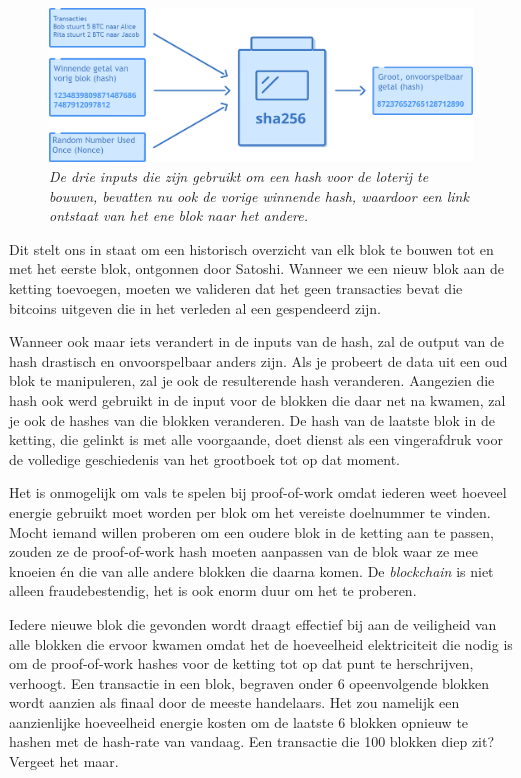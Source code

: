 \begin{figure}[h]
    \centering
    \includegraphics[width=\textwidth]{images/fig11.png}
    \caption{\footnotesize{\textit{De drie inputs die zijn gebruikt om een hash voor de loterij te bouwen, bevatten nu ook de vorige winnende hash, waardoor een link ontstaat van het ene blok naar het andere.}}}
    \label{fig11}
\end{figure}


Dit stelt ons in staat om een historisch overzicht van elk blok te bouwen tot en met het eerste blok, ontgonnen door Satoshi. Wanneer we een nieuw blok aan de ketting toevoegen, moeten we valideren dat het geen transacties bevat die bitcoins uitgeven die in het verleden al een gespendeerd zijn.

Wanneer ook maar iets verandert in de inputs van de hash, zal de output van de hash drastisch en onvoorspelbaar anders zijn. Als je probeert de data uit een oud blok te manipuleren, zal je ook de resulterende hash veranderen. Aangezien die hash ook werd gebruikt in de input voor de blokken die daar net na kwamen, zal je ook de hashes van die blokken veranderen. De hash van de laatste blok in de ketting, die gelinkt is met alle voorgaande, doet dienst als een vingerafdruk voor de volledige geschiedenis van het grootboek tot op dat moment.

Het is onmogelijk om vals te spelen bij proof-of-work omdat iederen weet hoeveel energie gebruikt moet worden per blok om het vereiste doelnummer te vinden. Mocht iemand willen proberen om een oudere blok in de ketting aan te passen, zouden ze de proof-of-work hash moeten aanpassen van de blok waar ze mee knoeien én die van alle andere blokken die daarna komen. De \textit{blockchain} is niet alleen fraudebestendig, het is ook enorm duur om het te proberen.

Iedere nieuwe blok die gevonden wordt draagt effectief bij aan de veiligheid van alle blokken die ervoor kwamen omdat het de hoeveelheid elektriciteit die nodig is om de proof-of-work hashes voor de ketting tot op dat punt te herschrijven, verhoogt. Een transactie in een blok, begraven onder 6 opeenvolgende blokken wordt aanzien als finaal door de meeste handelaars. Het zou namelijk een aanzienlijke hoeveelheid energie kosten om de laatste 6 blokken opnieuw te hashen met de hash-rate van vandaag. Een transactie die 100 blokken diep zit? Vergeet het maar.

